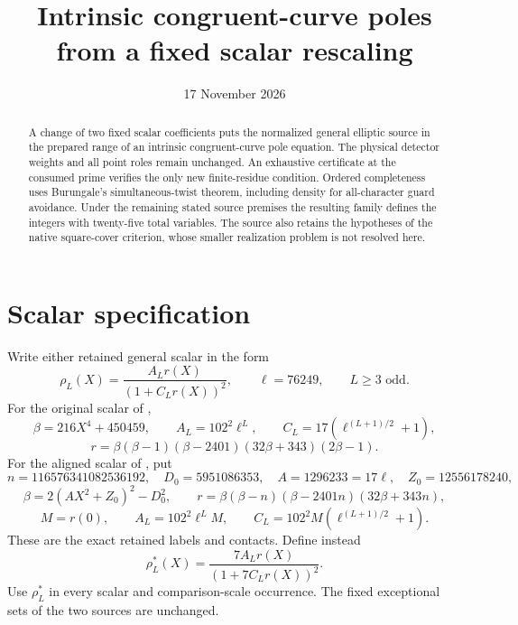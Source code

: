 \documentclass[11pt,a4paper]{article}
\title{Intrinsic congruent-curve poles from a fixed scalar rescaling}
\author{}\date{17 November 2026}
\begin{document}
\maketitle
\begin{abstract}
A change of two fixed scalar coefficients puts the normalized general
elliptic source in the prepared range of an intrinsic congruent-curve
pole equation. The physical detector weights and all point roles remain
unchanged. An exhaustive certificate at the consumed prime verifies the
only new finite-residue condition. Ordered completeness uses Burungale's
simultaneous-twist theorem, including density for all-character guard
avoidance. Under the remaining stated source premises the resulting
family defines the integers with twenty-five total variables. The source
also retains the hypotheses of the native square-cover criterion, whose
smaller realization problem is not resolved here.
\end{abstract}

\section{Scalar specification}

Write either retained general scalar in the form
\[
 \rho_L(X)=\frac{A_Lr(X)}{(1+C_Lr(X))^2},\qquad \ell=76249,
 \qquad L\ge3\text{ odd}.
\]
For the original scalar of \cite{General},
\[
 \beta=216X^4+450459,\qquad A_L=102^2\ell^L,
 \qquad C_L=17(\ell^{(L+1)/2}+1),
\]
\[
 r=\beta(\beta-1)(\beta-2401)(32\beta+343)(2\beta-1).
\]
For the aligned scalar of \cite{Aligned}, put
\[
 n=116576341082536192,\quad D_0=5951086353,\quad
 A=1296233=17\ell,\quad Z_0=12556178240,
\]
\[
 \beta=2(AX^2+Z_0)^2-D_0^2,
 \qquad r=\beta(\beta-n)(\beta-2401n)(32\beta+343n),
\]
\[
 M=r(0),\qquad A_L=102^2\ell^LM,
 \qquad C_L=102^2M(\ell^{(L+1)/2}+1).
\]
These are the exact retained labels and contacts. Define instead
\begin{equation}\label{eq:scalar}
                 \rho_L^*(X)=\frac{7A_Lr(X)}{(1+7C_Lr(X))^2}.
\end{equation}
Use \(\rho_L^*\) in every scalar and comparison-scale occurrence.
The fixed exceptional sets of the two sources are unchanged.
\end{document}
